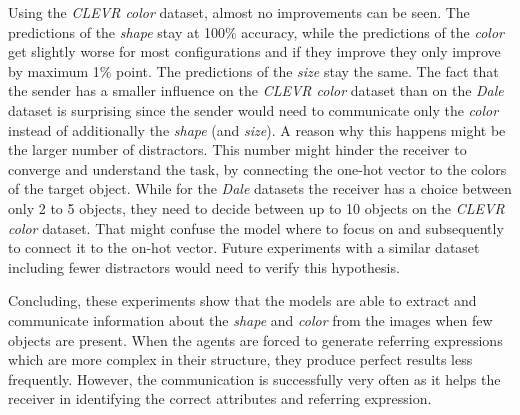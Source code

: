 Using the \emph{CLEVR color} dataset, almost no improvements can be seen.
The predictions of the \emph{shape} stay at 100\% accuracy, while the predictions of the \emph{color} get slightly worse for most configurations and if they improve they only improve by maximum 1\% point.
The predictions of the \emph{size} stay the same.
The fact that the sender has a smaller influence on the \emph{CLEVR color} dataset than on the \emph{Dale} dataset is surprising since the sender would need to communicate only the \emph{color} instead of additionally the \emph{shape} (and \emph{size}).
A reason why this happens might be the larger number of distractors.
This number might hinder the receiver to converge and understand the task, by connecting the one-hot vector to the colors of the target object.
While for the \emph{Dale} datasets the receiver has a choice between only 2 to 5 objects, they need to decide between up to 10 objects on the \emph{CLEVR color} dataset.
That might confuse the model where to focus on and subsequently to connect it to the on-hot vector.
Future experiments with a similar dataset including fewer distractors would need to verify this hypothesis.

Concluding, these experiments show that the models are able to extract and communicate information about the \emph{shape} and \emph{color} from the images when few objects are present.
When the agents are forced to generate referring expressions which are more complex in their structure, they produce perfect results less frequently.
However, the communication is successfully very often as it helps the receiver in identifying the correct attributes and referring expression.
